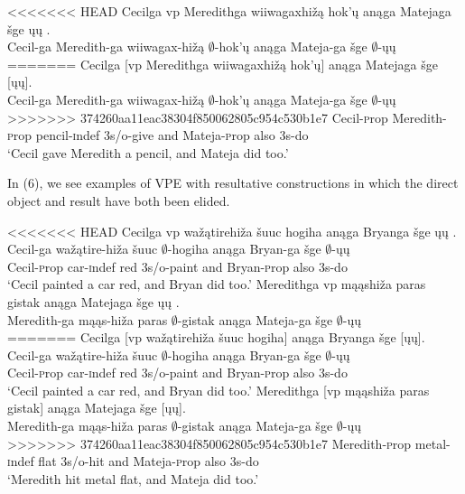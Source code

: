 \documentclass[output=paper]{LSP/langsci}
\begin{document}
\begin{exe}
\ex
<<<<<<< HEAD
\glll Cecilga {\ob}{vp} Meredithga wiiwagaxhižą hok'ų{\cb} anąga Matejaga šge {\ob}ųų{\cb} .\\
Cecil-ga {} Meredith-ga wiiwagax-hižą $\emptyset$-hok'ų anąga Mateja-ga šge $\emptyset$-ųų\\
=======
\glll Cecilga {\textsc [vp} Meredithga wiiwagaxhi\v{z}\k{a} hok'\k{u}{\textsc ]} an\k{a}ga Matejaga \v{s}ge {\textsc [}\k{u}\k{u}{\textsc ]}.\\
Cecil-ga {} Meredith-ga wiiwagax-hi\v{z}\k{a} $\emptyset$-hok'\k{u} an\k{a}ga Mateja-ga \v{s}ge $\emptyset$-\k{u}\k{u}\\
>>>>>>> 374260aa11eac38304f850062805c954c530b1e7
Cecil-{\textsc prop} {} Meredith-{\textsc prop} pencil-{\textsc indef} {\textsc 3s/o}-give and Mateja-{\textsc prop} also {\textsc 3s}-do\\
\trans `Cecil gave Meredith a pencil, and Mateja did too.'
\end{exe}

In (6), we see examples of VPE with resultative constructions in which the direct object and result have both been elided. 

\begin{exe}
\ex
\begin{xlist}
\ex
<<<<<<< HEAD
\glll Cecilga  {\ob}{vp} wažątirehiža šuuc hogiha{\cb} anąga Bryanga šge {\ob}ųų{\cb} .\\
Cecil-ga {} wažątire-hiža šuuc $\emptyset$-hogiha anąga Bryan-ga šge $\emptyset$-ųų\\
Cecil-{\textsc prop} {} car-{\textsc indef} red {\textsc 3s/o}-paint and Bryan-{\textsc prop} also {\textsc 3s}-do\\
\trans `Cecil painted a car red, and Bryan did too.'
\ex
\glll Meredithga  {\ob}{vp} mąąshiža paras gistak{\cb} anąga Matejaga šge {\ob}ųų{\cb} .\\
Meredith-ga {} mąąs-hiža paras $\emptyset$-gistak anąga Mateja-ga šge $\emptyset$-ųų\\
=======
\glll Cecilga  {\textsc [vp} wa\v{z}\k{a}tirehi\v{z}a \v{s}uuc hogiha{\textsc ]} an\k{a}ga Bryanga \v{s}ge {\textsc [}\k{u}\k{u}{\textsc ]}.\\
Cecil-ga {} wa\v{z}\k{a}tire-hi\v{z}a \v{s}uuc $\emptyset$-hogiha an\k{a}ga Bryan-ga \v{s}ge $\emptyset$-\k{u}\k{u}\\
Cecil-{\textsc prop} {} car-{\textsc indef} red {\textsc 3s/o}-paint and Bryan-{\textsc prop} also {\textsc 3s}-do\\
\trans `Cecil painted a car red, and Bryan did too.'
\ex
\glll Meredithga  {\textsc [vp} m\k{a}\k{a}shi\v{z}a paras gistak{\textsc ]} an\k{a}ga Matejaga \v{s}ge {\textsc [}\k{u}\k{u}{\textsc ]}.\\
Meredith-ga {} m\k{a}\k{a}s-hi\v{z}a paras $\emptyset$-gistak an\k{a}ga Mateja-ga \v{s}ge $\emptyset$-\k{u}\k{u}\\
>>>>>>> 374260aa11eac38304f850062805c954c530b1e7
Meredith-{\textsc prop} {} metal-{\textsc indef} flat {\textsc 3s/o}-hit and Mateja-{\textsc prop} also {\textsc 3s}-do\\
\trans `Meredith hit metal flat, and Mateja did too.'
\end{xlist}
\end{exe}
\end{document}
